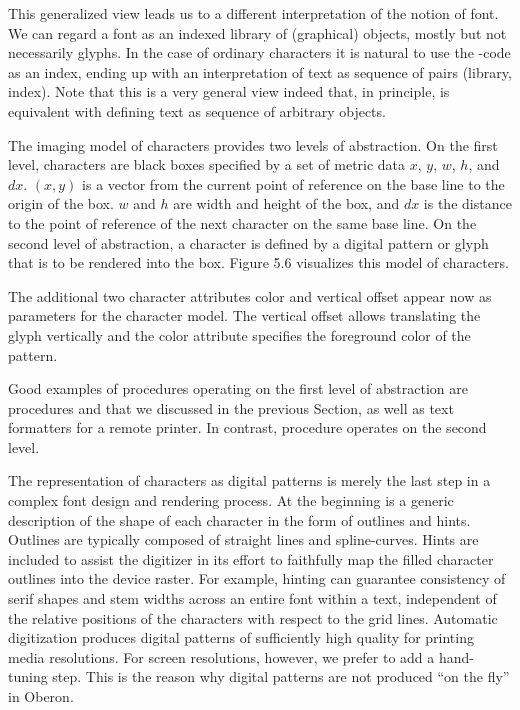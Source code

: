 This generalized view leads us to a different interpretation of the notion of font. We can regard a font as an indexed library of (graphical) objects, mostly but not necessarily glyphs. In the case of ordinary characters it is natural to use the -code as an index, ending up with an interpretation of text as sequence of pairs (library, index). Note that this is a very general view indeed that, in principle, is equivalent with defining text as sequence of arbitrary objects.

The imaging model of characters provides two levels of abstraction. On the first level, characters are black boxes specified by a set of metric data $x$, $y$, $w$, $h$, and $dx$. $(x, y)$ is a vector from the current point of reference on the base line to the origin of the box. $w$ and $h$ are width and height of the box, and $dx$ is the distance to the point of reference of the next character on the same base line. On the second level of abstraction, a character is defined by a digital pattern or glyph that is to be rendered into the box. Figure 5.6 visualizes this model of characters.

The additional two character attributes color and vertical offset appear now as parameters for the character model. The vertical offset allows translating the glyph vertically and the color attribute specifies the foreground color of the pattern.


Good examples of procedures operating on the first level of abstraction are procedures  and  that we discussed in the previous Section, as well as text formatters for a remote printer. In contrast, procedure  operates on the second level.

The representation of characters as digital patterns is merely the last step in a complex font design and rendering process. At the beginning is a generic description of the shape of each character in the form of outlines and hints. Outlines are typically composed of straight lines and spline-curves. Hints are included to assist the digitizer in its effort to faithfully map the filled character outlines into the device raster. For example, hinting can guarantee consistency of serif shapes and stem widths across an entire font within a text, independent of the relative positions of the characters with respect to the grid lines. Automatic digitization produces digital patterns of sufficiently high quality for printing media resolutions. For screen resolutions, however, we prefer to add a hand-tuning step. This is the reason why digital patterns are not produced ``on the fly'' in Oberon.

